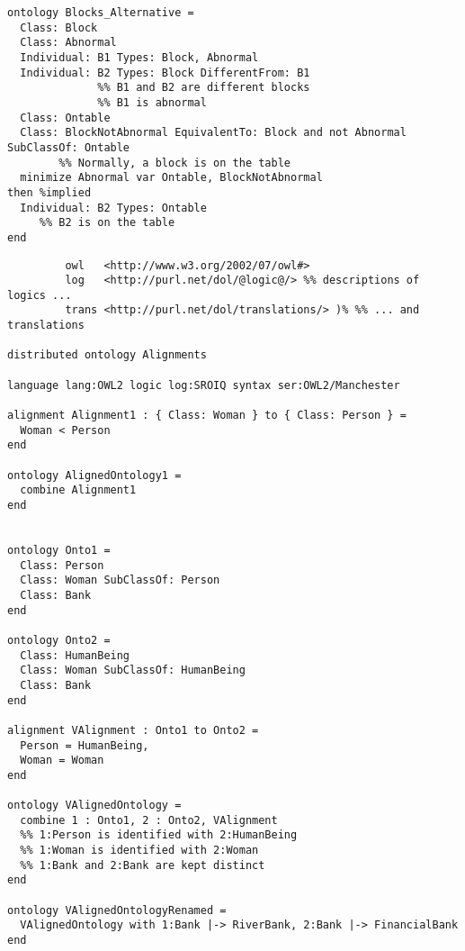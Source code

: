 \documentclass[%
\ifpretendfinal
final%
\else
draft%
\fi,
a4paper,
wd]{isov2}
\begin{document}
 
  \begin{lstlisting}[language=dolText,morekeywords={forall,if,not,circ,var,Class,Individual,EquivalentTo,and,SubClassOf}]
ontology Blocks_Alternative =
  Class: Block
  Class: Abnormal
  Individual: B1 Types: Block, Abnormal
  Individual: B2 Types: Block DifferentFrom: B1
              %% B1 and B2 are different blocks
              %% B1 is abnormal
  Class: Ontable 
  Class: BlockNotAbnormal EquivalentTo: Block and not Abnormal SubClassOf: Ontable 
        %% Normally, a block is on the table
  minimize Abnormal var Ontable, BlockNotAbnormal
then %implied
  Individual: B2 Types: Ontable
     %% B2 is on the table
end
  \end{lstlisting}


\begin{lstlisting}[basicstyle=\ttfamily,language=dolText,morekeywords={props,ObjectProperty,Class,DisjointUnionOf,SubClassOf,Characteristics,Transitive,Asymmetric,SubPropertyOf,DisjointClasses,EquivalentTo,inverse,only,forall,iff,if,or,exists,bridge,distributed},escapechar=@,mathescape]
%prefix( :     <http://www.example.org/alignment#>
         owl   <http://www.w3.org/2002/07/owl#>
         log   <http://purl.net/dol/@logic@/> %% descriptions of logics ...
         trans <http://purl.net/dol/translations/> )% %% ... and translations

distributed ontology Alignments

language lang:OWL2 logic log:SROIQ syntax ser:OWL2/Manchester

alignment Alignment1 : { Class: Woman } to { Class: Person } =
  Woman < Person
end

ontology AlignedOntology1 =
  combine Alignment1
end


ontology Onto1 =
  Class: Person
  Class: Woman SubClassOf: Person
  Class: Bank
end

ontology Onto2 =
  Class: HumanBeing
  Class: Woman SubClassOf: HumanBeing
  Class: Bank
end

alignment VAlignment : Onto1 to Onto2 =
  Person = HumanBeing,
  Woman = Woman
end

ontology VAlignedOntology =
  combine 1 : Onto1, 2 : Onto2, VAlignment
  %% 1:Person is identified with 2:HumanBeing
  %% 1:Woman is identified with 2:Woman
  %% 1:Bank and 2:Bank are kept distinct
end

ontology VAlignedOntologyRenamed =
  VAlignedOntology with 1:Bank |-> RiverBank, 2:Bank |-> FinancialBank
end

\end{lstlisting}
\end{document}
